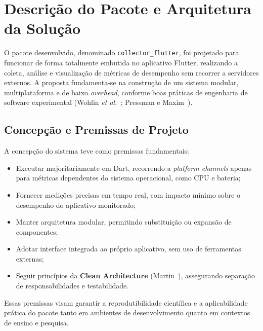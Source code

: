 \section{Descrição do Pacote e Arquitetura da Solução}

O pacote desenvolvido, denominado \texttt{collector\_flutter}, foi projetado para funcionar de forma totalmente embutida no aplicativo Flutter, realizando a coleta, análise e visualização de métricas de desempenho sem recorrer a servidores externos.
A proposta fundamenta-se na construção de um sistema modular, multiplataforma e de baixo \textit{overhead}, conforme boas práticas de engenharia de software experimental (Wohlin \textit{et al.}~\cite{wohlin2012}; Pressman e Maxim~\cite{pressman2020engenharia}).

\subsection{Concepção e Premissas de Projeto}

A concepção do sistema teve como premissas fundamentais:

\begin{itemize}
  \item Executar majoritariamente em Dart, recorrendo a \textit{platform channels} apenas para métricas dependentes do sistema operacional, como CPU e bateria;
  \item Fornecer medições precisas em tempo real, com impacto mínimo sobre o desempenho do aplicativo monitorado;
  \item Manter arquitetura modular, permitindo substituição ou expansão de componentes;
  \item Adotar interface integrada ao próprio aplicativo, sem uso de ferramentas externas;
  \item Seguir princípios da \textbf{Clean Architecture} (Martin~\cite{martin2018clean}), assegurando separação de responsabilidades e testabilidade.
\end{itemize}

Essas premissas visam garantir a reprodutibilidade científica e a aplicabilidade prática do pacote tanto em ambientes de desenvolvimento quanto em contextos de ensino e pesquisa.

